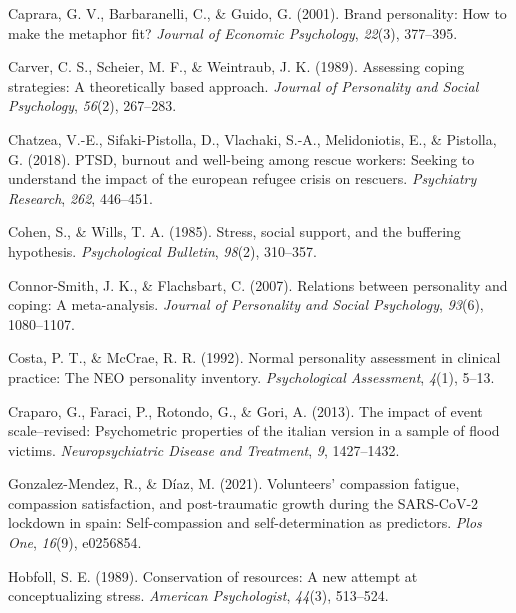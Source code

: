 \documentclass[
  man]{apa6}
\newlength{\cslhangindent}
\newlength{\cslentryspacingunit} %
\newenvironment{CSLReferences}[2] %
 {%
  \setlength{\parindent}{0pt}
  \ifodd #1
  \let\oldpar\par
  \def\par{\hangindent=\cslhangindent\oldpar}
  \fi
  \setlength{\parskip}{#2\cslentryspacingunit}
 }%
 {}
\begin{document}
\begin{CSLReferences}{1}{0}
\leavevmode{}%
Caprara, G. V., Barbaranelli, C., \& Guido, G. (2001). Brand personality: How to make the metaphor fit? \emph{Journal of Economic Psychology}, \emph{22}(3), 377--395.

\leavevmode{}%
Carver, C. S., Scheier, M. F., \& Weintraub, J. K. (1989). Assessing coping strategies: A theoretically based approach. \emph{Journal of Personality and Social Psychology}, \emph{56}(2), 267--283.

\leavevmode{}%
Chatzea, V.-E., Sifaki-Pistolla, D., Vlachaki, S.-A., Melidoniotis, E., \& Pistolla, G. (2018). PTSD, burnout and well-being among rescue workers: Seeking to understand the impact of the european refugee crisis on rescuers. \emph{Psychiatry Research}, \emph{262}, 446--451.

\leavevmode{}%
Cohen, S., \& Wills, T. A. (1985). Stress, social support, and the buffering hypothesis. \emph{Psychological Bulletin}, \emph{98}(2), 310--357.

\leavevmode{}%
Connor-Smith, J. K., \& Flachsbart, C. (2007). Relations between personality and coping: A meta-analysis. \emph{Journal of Personality and Social Psychology}, \emph{93}(6), 1080--1107.

\leavevmode{}%
Costa, P. T., \& McCrae, R. R. (1992). Normal personality assessment in clinical practice: The NEO personality inventory. \emph{Psychological Assessment}, \emph{4}(1), 5--13.

\leavevmode{}%
Craparo, G., Faraci, P., Rotondo, G., \& Gori, A. (2013). The impact of event scale--revised: Psychometric properties of the italian version in a sample of flood victims. \emph{Neuropsychiatric Disease and Treatment}, \emph{9}, 1427--1432.

\leavevmode{}%
Gonzalez-Mendez, R., \& Díaz, M. (2021). Volunteers' compassion fatigue, compassion satisfaction, and post-traumatic growth during the SARS-CoV-2 lockdown in spain: Self-compassion and self-determination as predictors. \emph{Plos One}, \emph{16}(9), e0256854.

\leavevmode{}%
Hobfoll, S. E. (1989). Conservation of resources: A new attempt at conceptualizing stress. \emph{American Psychologist}, \emph{44}(3), 513--524.


\end{CSLReferences}
\end{document}
